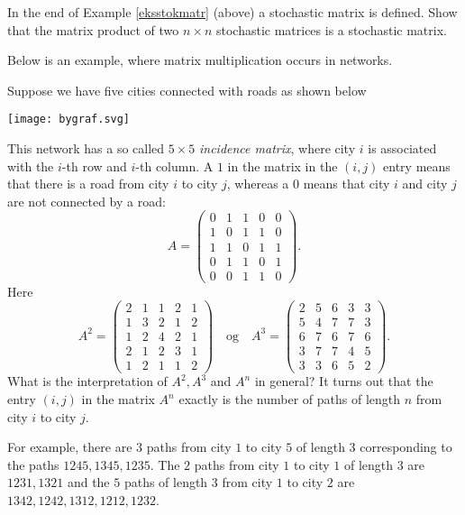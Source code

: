 \documentclass{article}
\begin{document}
\beginshex
In the end of Example \ref{eksstokmatr} (above) a stochastic matrix is defined. Show that
the matrix product of two $n\times n$ stochastic matrices is a stochastic matrix.
\endshex

Below is an example, where  matrix multiplication occurs in networks.

\begin{example}
  Suppose we have five cities connected with roads as shown below

\texttt{[image: bygraf.svg]}

This network has a so called $5\times 5$ \emph{incidence matrix}, where city $i$ is associated with the
$i$-th row and $i$-th column. A $1$ in the matrix in the $(i, j)$ entry means that there is a road
from city $i$ to city $j$, whereas a $0$ means that city $i$ and city $j$ are not connected by a road:
$$
A = \begin{pmatrix}
0 & 1 & 1 & 0 & 0\\
1 & 0 & 1 & 1 & 0\\
1 & 1 & 0 & 1 & 1\\
0 & 1 & 1 & 0 & 1\\
0 & 0 & 1 & 1 & 0
\end{pmatrix}.
$$
Here
$$
A^2 =  
\begin{pmatrix}
2 & 1 & 1 & 2 & 1 \\
1 & 3 & 2 & 1 & 2 \\
1 & 2 & 4 & 2 & 1 \\
2 & 1 & 2 & 3 & 1 \\
1 & 2 & 1 & 1 & 2 
\end{pmatrix}\quad\text{og}\quad
A^3 =
\begin{pmatrix}
 2 & 5 & 6 & 3 & 3 \\
 5 & 4 & 7 & 7 & 3 \\
 6 & 7 & 6 & 7 & 6 \\
 3 & 7 & 7 & 4 & 5 \\
 3 & 3 & 6 & 5 & 2 
\end{pmatrix}.
$$
What is the interpretation of $A^2, A^3$ and  $A^n$ in general?
It turns out that the entry $(i, j)$ in the matrix $A^n$ exactly is
the number of paths of length $n$ from city $i$ to city $j$.


For example, there are $3$ paths from city $1$ to city $5$ of length $3$
corresponding to the paths $1245, 1345, 1235$.  The $2$ paths from city $1$ to city $1$ of
length $3$ are $1231, 1321$ and the  $5$ paths of length $3$ from city $1$ to city 
$2$ are $1342, 1242, 1312, 1212, 1232$.



\end{example}
\end{document}
